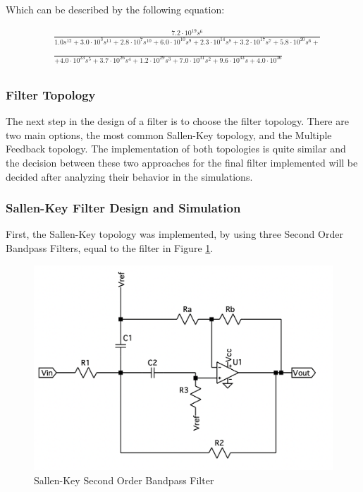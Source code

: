 Which can be described by the following equation:

\begin{equation}
    \begin{aligned}
        & \frac{7.2 \cdot 10^{19} s^{6}}{1.0 s^{12} + 3.0 \cdot 10^{3} s^{11} + 2.8 \cdot 10^{7} s^{10} + 6.0 \cdot 10^{10} s^{9} + 2.3 \cdot 10^{14} s^{8} + 3.2 \cdot 10^{17} s^{7} + 5.8 \cdot 10^{20} s^{6} + } \\
        &\\
        & \frac{}{ + 4.0 \cdot 10^{23} s^{5} + 3.7 \cdot 10^{26} s^{4} + 1.2 \cdot 10^{29} s^{3} + 7.0 \cdot 10^{31} s^{2} + 9.6 \cdot 10^{33} s + 4.0 \cdot 10^{36}} \\
        &      
    \end{aligned}    
    \label{eq:FilterFT}
\end{equation}

\subsubsection{Filter Topology}

The next step in the design of a filter is to choose the filter topology. There are two main options, the most common Sallen-Key topology, and the Multiple Feedback topology. The implementation of both topologies is quite similar and the decision between these two approaches for the final filter implemented will be decided after analyzing their behavior in the simulations.

\subsubsection{Sallen-Key Filter Design and Simulation}

First, the Sallen-Key topology was implemented, by using three Second Order Bandpass Filters, equal to the filter in Figure \ref{fig:SingleSK}.

\begin{figure}[H]
    \centering
    \includegraphics*[scale = 0.3]{Images/SingleSK.png}
    \caption{Sallen-Key Second Order Bandpass Filter}
    \label{fig:SingleSK}
\end{figure}

